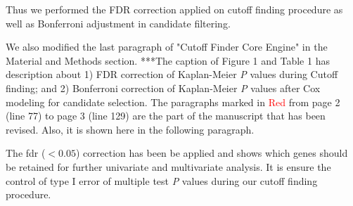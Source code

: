 \documentclass[preprint,12pt]{elsarticle}
\newenvironment{MyColorPar}[1]{%
    \leavevmode\color{#1}\ignorespaces%
}{%
}%
\begin{document}
\begin{MyColorPar}{blue}
Thus we performed the FDR correction applied on cutoff finding procedure as well as Bonferroni adjustment in candidate filtering.



We also modified the last paragraph of "Cutoff Finder Core Engine" in the Material and Methods section.
***The caption of Figure 1 and Table 1 has description about 1) FDR correction of Kaplan-Meier \textit{P} values during Cutoff finding; and 2) Bonferroni correction of Kaplan-Meier \textit{P} values after Cox modeling for candidate selection.
The paragraphs marked in \textcolor{red}{Red} from page 2 (line 77) to page 3 (line 129) are the part of the manuscript that has been revised. Also, it is shown here in the following paragraph.
\\[0.3cm]

\begin{MyColorPar}{red}

The \acrfull{fdr} ($< 0.05$) correction\cite{Benjamini1995a} has been be applied and shows which genes should be retained for further univariate and multivariate analysis.
It is ensure the control of type I error of multiple test \textit{P} values during our cutoff finding procedure.
\end{MyColorPar}


\end{MyColorPar}


\end{document}
